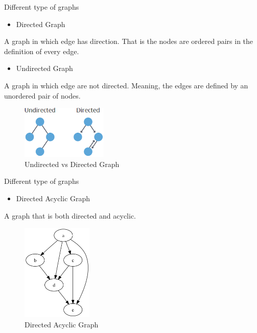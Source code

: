 \documentclass[ignorenonframetext,]{beamer}
\providecommand{\tightlist}{%
  \setlength{\itemsep}{0pt}\setlength{\parskip}{0pt}}
\begin{document}
\begin{frame}{Different type of graphs}
\protect\hypertarget{different-type-of-graphs-1}{}

\begin{itemize}
\tightlist
\item
  Directed Graph
\end{itemize}

A graph in which edge has direction. That is the nodes are ordered pairs
in the definition of every edge.

\begin{itemize}
\tightlist
\item
  Undirected Graph
\end{itemize}

A graph in which edge are not directed. Meaning, the edges are defined
by an unordered pair of nodes.

\begin{figure}
\centering
\includegraphics[width=\textwidth,height=1in]{undirected-directed.png}
\caption{Undirected vs Directed Graph}
\end{figure}

\end{frame}

\begin{frame}{Different type of graphs}
\protect\hypertarget{different-type-of-graphs-2}{}

\begin{itemize}
\tightlist
\item
  Directed Acyclic Graph
\end{itemize}

A graph that is both directed and acyclic.

\begin{figure}
\centering
\includegraphics[width=\textwidth,height=1.82292in]{dag.png}
\caption{Directed Acyclic Graph}
\end{figure}

\end{frame}
\end{document}

